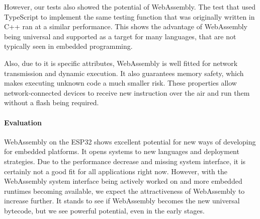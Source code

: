 However, our tests also showed the potential of WebAssembly. The test that used TypeScript to implement the same testing function that was originally written in C++ ran at a similar performance. This shows the advantage of WebAssembly being universal and supported as a target for many languages, that are not typically seen in embedded programming.

Also, due to it is specific attributes, WebAssembly is well fitted for network transmission and dynamic execution. It also guarantees memory safety, which makes executing unknown code a much smaller risk. These properties allow network-connected devices to receive new instruction over the air and run them without a flash being required.

\paragraph{Evaluation}

WebAssembly on the ESP32 shows excellent potential for new ways of developing for embedded platforms. It opens systems to new languages and deployment strategies. Due to the performance decrease and missing system interface, it is certainly not a good fit for all applications right now. However, with the WebAssembly system interface being actively worked on and more embedded runtimes becoming available, we expect the attractiveness of WebAssembly to increase further. It stands to see if WebAssembly becomes the new universal bytecode, but we see powerful potential, even in the early stages.